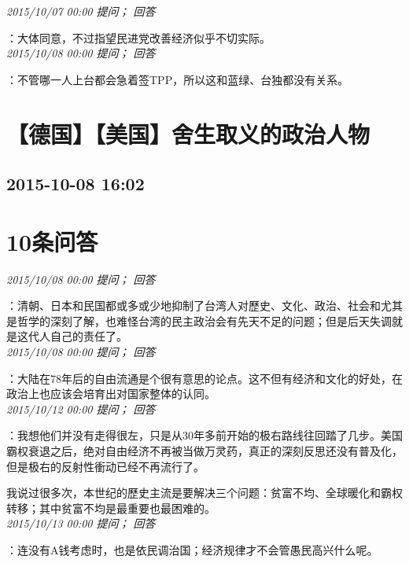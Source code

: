 \documentclass[twocolumn]{ctexart}
\begin{document}
\textit{\hfill\noindent\small 2015/10/07 00:00 提问； 回答}

：大体同意，不过指望民进党改善经济似乎不切实际。\\

\textit{\hfill\noindent\small 2015/10/08 00:00 提问； 回答}

：不管哪一人上台都会急着签TPP，所以这和蓝绿、台独都没有关系。\\


\section{【德国】【美国】舍生取义的政治人物}
\subsection{2015-10-08 16:02}


\section{10条问答}

\textit{\hfill\noindent\small 2015/10/08 00:00 提问； 回答}

：清朝、日本和民国都或多或少地抑制了台湾人对歷史、文化、政治、社会和尤其是哲学的深刻了解，也难怪台湾的民主政治会有先天不足的问题；但是后天失调就是这代人自己的责任了。\\

\textit{\hfill\noindent\small 2015/10/08 00:00 提问； 回答}

：大陆在78年后的自由流通是个很有意思的论点。这不但有经济和文化的好处，在政治上也应该会培育出对国家整体的认同。\\

\textit{\hfill\noindent\small 2015/10/12 00:00 提问； 回答}

：我想他们并没有走得很左，只是从30年多前开始的极右路线往回踏了几步。美国霸权衰退之后，绝对自由经济不再被当做万灵药，真正的深刻反思还没有普及化，但是极右的反射性衝动已经不再流行了。

我说过很多次，本世纪的歷史主流是要解决三个问题：贫富不均、全球暖化和霸权转移；其中贫富不均是最重要也最困难的。\\

\textit{\hfill\noindent\small 2015/10/13 00:00 提问； 回答}

：连没有A钱考虑时，也是依民调治国；经济规律才不会管愚民高兴什么呢。\\
\end{document}
